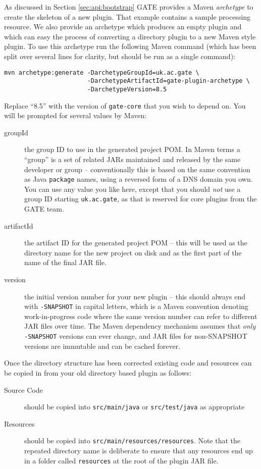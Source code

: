 As discussed in Section \ref{sec:api:bootstrap} GATE provides a Maven \emph{archetype}
to create the skeleton of a new plugin. That example contains a sample processing
resource. We also provide an archetype which produces an empty plugin and which
can easy the process of converting a directory plugin to a new Maven style plugin.
To use this archetype run the following Maven
command (which has been split over several lines for clarity, but should be run
as a single command):
\begin{verbatim}
mvn archetype:generate -DarchetypeGroupId=uk.ac.gate \
                       -DarchetypeArtifactId=gate-plugin-archetype \
                       -DarchetypeVersion=8.5
\end{verbatim}
Replace ``8.5'' with the version of \texttt{gate-core} that you wish to depend
on.  You will be prompted for several values by Maven:
\begin{description}
\item[groupId] the group ID to use in the generated project POM. In Maven terms
  a ``group'' is a set of related JARs maintained and released by the same
  developer or group -- conventionally this is based on the same convention as
  Java \texttt{package} names, using a reversed form of a DNS domain you own.
  You can use any value you like here, except that you should \emph{not} use
  a group ID starting \texttt{uk.ac.gate}, as that is reserved for core plugins
  from the GATE team.
\item[artifactId] the artifact ID for the generated project POM -- this will be
  used as the directory name for the new project on disk and as the first part
  of the name of the final JAR file.
\item[version] the initial version number for your new plugin -- this should
  always end with \verb!-SNAPSHOT! in capital letters, which is a Maven
  convention denoting work-in-progress code where the same version number can
  refer to different JAR files over time.  The Maven dependency mechanism
  assumes that \emph{only} \verb!-SNAPSHOT! versions can ever change, and
  JAR files for non-SNAPSHOT versions are immutable and can be cached forever.
\end{description}

Once the directory structure has been corrected existing code and resources can
be copied in from your old directory based plugin as follows:

\begin{description}
\item[Source Code] should be copied into \verb!src/main/java! or \verb!src/test/java!
  as appropriate
\item[Resources] should be copied into \verb!src/main/resources/resources!. Note that 
  the repeated directory name is deliberate to ensure that any resources end up in a
  folder called \verb!resources! at the root of the plugin JAR file.
\end{description}

